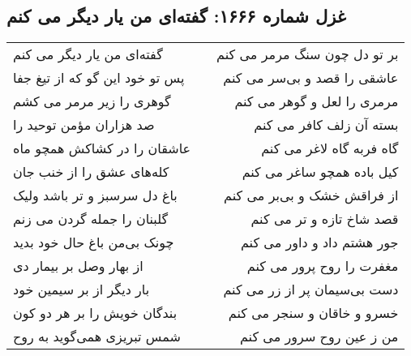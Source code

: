 \begin{center}
\section*{غزل شماره ۱۶۶۶: گفته‌ای من یار دیگر می کنم}
\label{sec:1666}
\begin{longtable}{l p{0.5cm} r}
گفته‌ای من یار دیگر می کنم
&&
بر تو دل چون سنگ مرمر می کنم
\\
پس تو خود این گو که از تیغ جفا
&&
عاشقی را قصد و بی‌سر می کنم
\\
گوهری را زیر مرمر می کشم
&&
مرمری را لعل و گوهر می کنم
\\
صد هزاران مؤمن توحید را
&&
بسته آن زلف کافر می کنم
\\
عاشقان را در کشاکش همچو ماه
&&
گاه فربه گاه لاغر می کنم
\\
کله‌های عشق را از خنب جان
&&
کیل باده همچو ساغر می کنم
\\
باغ دل سرسبز و تر باشد ولیک
&&
از فراقش خشک و بی‌بر می کنم
\\
گلبنان را جمله گردن می زنم
&&
قصد شاخ تازه و تر می کنم
\\
چونک بی‌من باغ حال خود بدید
&&
جور هشتم داد و داور می کنم
\\
از بهار وصل بر بیمار دی
&&
مغفرت را روح پرور می کنم
\\
بار دیگر از بر سیمین خود
&&
دست بی‌سیمان پر از زر می کنم
\\
بندگان خویش را بر هر دو کون
&&
خسرو و خاقان و سنجر می کنم
\\
شمس تبریزی همی‌گوید به روح
&&
من ز عین روح سرور می کنم
\\
\end{longtable}
\end{center}
